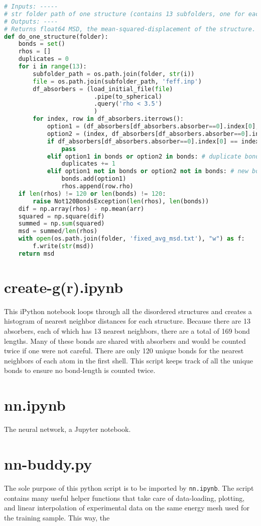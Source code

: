 \pagebreak
\begin{lstlisting}[language=Python]
# Inputs: -----
# str folder path of one structure (contains 13 subfolders, one for each absober)
# Outputs: ----
# Returns float64 MSD, the mean-squared-displacement of the structure.
def do_one_structure(folder):
    bonds = set()
    rhos = []
    duplicates = 0
    for i in range(13):
        subfolder_path = os.path.join(folder, str(i))
        file = os.path.join(subfolder_path, 'feff.inp')
        df_absorbers = (load_initial_file(file)
                         .pipe(to_spherical)
                         .query('rho < 3.5')
                         )
        for index, row in df_absorbers.iterrows():
            option1 = (df_absorbers[df_absorbers.absorber==0].index[0], index)
            option2 = (index, df_absorbers[df_absorbers.absorber==0].index[0])
            if df_absorbers[df_absorbers.absorber==0].index[0] == index:
                pass
            elif option1 in bonds or option2 in bonds: # duplicate bond found
                duplicates += 1
            elif option1 not in bonds or option2 not in bonds: # new bond found
                bonds.add(option1)
                rhos.append(row.rho)
    if len(rhos) != 120 or len(bonds) != 120:
        raise Not120BondsException(len(rhos), len(bonds))
    dif = np.array(rhos) - np.mean(arr)
    squared = np.square(dif)
    summed = np.sum(squared)
    msd = summed/len(rhos)
    with open(os.path.join(folder, 'fixed_avg_msd.txt'), "w") as f:
        f.write(str(msd))
    return msd
\end{lstlisting}



\section{create-g(r).ipynb}

This iPython notebook loops through all the disordered structures and creates a histogram of nearest neighbor distances for each structure. Because there are 13 absorbers, each of which has 13 nearest neighbors, there are a total of 169 bond lengths. Many of these bonds are shared with absorbers and would be counted twice if one were not careful. There are only 120 unique bonds for the nearest neighbors of each atom in the first shell. This script keeps track of all the unique bonds to ensure no bond-length is counted twice.

\section{nn.ipynb}
The neural network, a Jupyter notebook.

\section{nn-buddy.py}
The sole purpose of this python script is to be imported by \texttt{nn.ipynb}. The script contains many useful helper functions that take care of data-loading, plotting, and linear interpolation of experimental data on the same energy mesh used for the training sample. This way, the 
